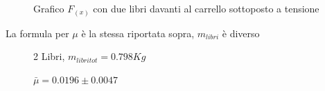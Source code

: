 \documentclass[a4paper]{article}
\theoremstyle{definition}
\begin{document}
\begin{figure}[!ht]
	\captionsetup{labelformat=empty}
	\caption{Grafico \(F_{(x)}\) con due libri davanti al carrello sottoposto a tensione}
	
\end{figure}
\noindent La formula per \(\mu\) è la stessa riportata sopra, \(m_{libri}\) è diverso
\begin{figure}[!htbp]
	\captionsetup{labelformat=empty}
	\caption{2 Libri, \(m_{libri tot} = 0.798 Kg\)}
	\caption{\(\bar{\mu} = 0.0196 \pm 0.0047\)}
\end{figure}
\end{document}
